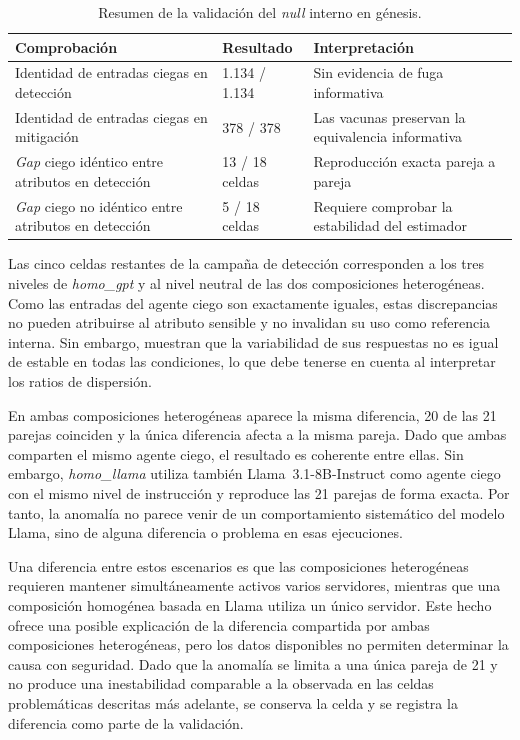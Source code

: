 \begin{table}[htbp]
	\centering
	\caption{Resumen de la validación del \textit{null} interno en génesis.}
	\label{tab:validacion_null}
	\small
	\begin{tabular}{p{6.2cm} p{3.0cm} p{4.2cm}}
		\hline
		\textbf{Comprobación} &
		\textbf{Resultado} &
		\textbf{Interpretación} \\
		\hline
		
		Identidad de entradas ciegas en detección
		& 1.134 / 1.134
		& Sin evidencia de fuga informativa \\
		
		Identidad de entradas ciegas en mitigación
		& 378 / 378
		& Las vacunas preservan la equivalencia informativa \\
		
		\textit{Gap} ciego idéntico entre atributos en detección
		& 13 / 18 celdas
		& Reproducción exacta pareja a pareja \\
		
		\textit{Gap} ciego no idéntico entre atributos en detección
		& 5 / 18 celdas
		& Requiere comprobar la estabilidad del estimador \\
		
		\hline
	\end{tabular}
\end{table}

Las cinco celdas restantes de la campaña de detección corresponden a los tres niveles de \textit{homo\_gpt} y al nivel neutral de las dos composiciones heterogéneas. Como las entradas del agente ciego son exactamente iguales, estas discrepancias no pueden atribuirse al atributo sensible y no invalidan su uso como referencia interna. Sin embargo, muestran que la variabilidad de sus respuestas no es igual de estable en todas las condiciones, lo que debe tenerse en cuenta al interpretar los ratios de dispersión.

En ambas composiciones heterogéneas aparece la misma diferencia, 20 de las 21 parejas coinciden y la única diferencia afecta a la misma pareja. Dado que ambas comparten el mismo agente ciego, el resultado es coherente entre ellas. Sin embargo, \textit{homo\_llama} utiliza también Llama~3.1-8B-Instruct como agente ciego con el mismo nivel de instrucción y reproduce las 21 parejas de forma exacta. Por tanto, la anomalía no parece venir de un comportamiento sistemático del modelo Llama, sino de alguna diferencia o problema en esas ejecuciones.

Una diferencia entre estos escenarios es que las composiciones heterogéneas requieren mantener simultáneamente activos varios servidores, mientras que una composición homogénea basada en Llama utiliza un único servidor. Este hecho ofrece una posible explicación de la diferencia compartida por ambas composiciones heterogéneas, pero los datos disponibles no permiten determinar la causa con seguridad. Dado que la anomalía se limita a una única pareja de 21 y no produce una inestabilidad comparable a la observada en las celdas problemáticas descritas más adelante, se conserva la celda y se registra la diferencia como parte de la validación.

